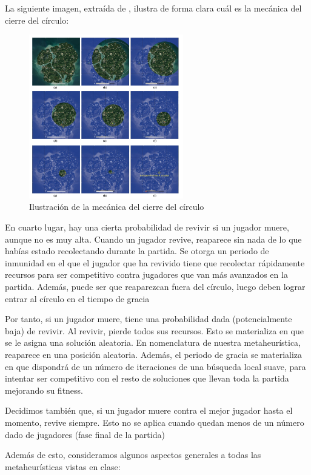 \documentclass[11pt]{article}
\begin{document}
La siguiente imagen, extraída de \cite{other_paper:paper}, ilustra de forma clara cuál es la mecánica del cierre del círculo:

\begin{figure}[H]
    \centering
    \includegraphics[width=0.6\textwidth]{cierre_circulo}
    \caption{Ilustración de la mecánica del cierre del círculo}
\end{figure}

En cuarto lugar, hay una cierta probabilidad de revivir si un jugador muere, aunque no es muy alta. Cuando un jugador revive, reaparece sin nada de lo que habías estado recolectando durante la partida. Se otorga un periodo de inmunidad en el que el jugador que ha revivido tiene que recolectar rápidamente recursos para ser competitivo contra jugadores que van más avanzados en la partida. Además, puede ser que reaparezcan fuera del círculo, luego deben lograr entrar al círculo en el tiempo de gracia

Por tanto, si un jugador muere, tiene una probabilidad dada (potencialmente baja) de revivir. Al revivir, pierde todos sus recursos. Esto se materializa en que se le asigna una solución aleatoria. En nomenclatura de nuestra metaheurística, reaparece en una posición aleatoria. Además, el periodo de gracia se materializa en que dispondrá de un número de iteraciones de una búsqueda local suave,  para intentar ser competitivo con el resto de soluciones que llevan toda la partida mejorando su fitness.

Decidimos también que, si un jugador muere contra el mejor jugador hasta el momento, revive siempre. Esto no se aplica cuando quedan menos de un número dado de jugadores (fase final de la partida)

Además de esto, consideramos algunos aspectos generales a todas las metaheurísticas vistas en clase:
\end{document}
